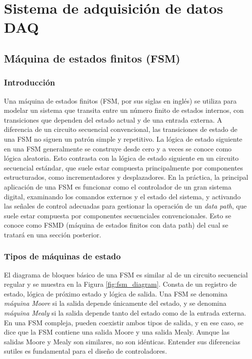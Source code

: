 \chapter{Sistema de adquisición de datos DAQ}

  \section{Máquina de estados finitos (FSM)}

    \subsection{Introducción}

    Una máquina de estados finitos (FSM, por sus siglas en inglés) se utiliza para modelar un sistema que transita entre un número finito de estados internos, con transiciones que dependen del estado actual y de una entrada externa. A diferencia de un circuito secuencial convencional, las transiciones de estado de una FSM no siguen un patrón simple y repetitivo. La lógica de estado siguiente en una FSM generalmente se construye desde cero y a veces se conoce como lógica aleatoria. Esto contrasta con la lógica de estado siguiente en un circuito secuencial estándar, que suele estar compuesta principalmente por componentes estructurados, como incrementadores y desplazadores. En la práctica, la principal aplicación de una FSM es funcionar como el controlador de un gran sistema digital, examinando los comandos externos y el estado del sistema, y activando las señales de control adecuadas para gestionar la operación de un \textit{data path}, que suele estar compuesta por componentes secuenciales convencionales. Esto se conoce como FSMD (máquina de estados finitos con data path) del cual se tratará en una sección posterior.

    \subsection{Tipos de máquinas de estado}

    El diagrama de bloques básico de una FSM es similar al de un circuito secuencial regular y se muestra en la Figura \ref{fig:fsm_diagram}. Consta de un registro de estado, lógica de próximo estado y lógica de salida. Una FSM se denomina \textit{máquina Moore} si la salida depende únicamente del estado, y se denomina \textit{máquina Mealy} si la salida depende tanto del estado como de la entrada externa. En una FSM compleja, pueden coexistir ambos tipos de salida, y en ese caso, se dice que la FSM contiene una salida Moore y una salida Mealy. Aunque las salidas Moore y Mealy son similares, no son idénticas. Entender sus diferencias sutiles es fundamental para el diseño de controladores.

